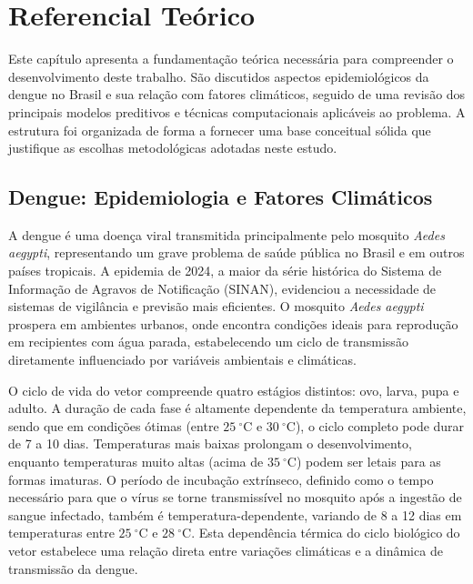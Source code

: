 \chapter{Referencial Teórico}
\label{cap:referencial}

Este capítulo apresenta a fundamentação teórica necessária para compreender o desenvolvimento deste trabalho. São discutidos aspectos epidemiológicos da dengue no Brasil e sua relação com fatores climáticos, seguido de uma revisão dos principais modelos preditivos e técnicas computacionais aplicáveis ao problema. A estrutura foi organizada de forma a fornecer uma base conceitual sólida que justifique as escolhas metodológicas adotadas neste estudo.

\section{Dengue: Epidemiologia e Fatores Climáticos}

A dengue é uma doença viral transmitida principalmente pelo mosquito \textit{Aedes aegypti}, representando um grave problema de saúde pública no Brasil e em outros países tropicais. A epidemia de 2024, a maior da série histórica do Sistema de Informação de Agravos de Notificação (SINAN), evidenciou a necessidade de sistemas de vigilância e previsão mais eficientes. O mosquito \textit{Aedes aegypti} prospera em ambientes urbanos, onde encontra condições ideais para reprodução em recipientes com água parada, estabelecendo um ciclo de transmissão diretamente influenciado por variáveis ambientais e climáticas.

O ciclo de vida do vetor compreende quatro estágios distintos: ovo, larva, pupa e adulto. A duração de cada fase é altamente dependente da temperatura ambiente, sendo que em condições ótimas (entre $25~^\circ\mathrm{C}$  e $30~^\circ\mathrm{C}$), o ciclo completo pode durar de 7 a 10 dias. Temperaturas mais baixas prolongam o desenvolvimento, enquanto temperaturas muito altas (acima de $35~^\circ\mathrm{C}$) podem ser letais para as formas imaturas. O período de incubação extrínseco, definido como o tempo necessário para que o vírus se torne transmissível no mosquito após a ingestão de sangue infectado, também é temperatura-dependente, variando de 8 a 12 dias em temperaturas entre $25~^\circ\mathrm{C}$ e $28~^\circ\mathrm{C}$. Esta dependência térmica do ciclo biológico do vetor estabelece uma relação direta entre variações climáticas e a dinâmica de transmissão da dengue.

